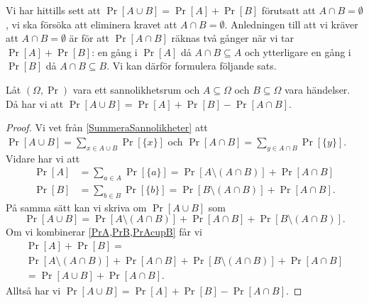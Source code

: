 Vi har hittills sett att \(\Pr[A\cup B] = \Pr[A] + \Pr[B]\) förutsatt att 
\(A\cap B = \emptyset\), vi ska försöka att eliminera kravet att \(A\cap
  B =\emptyset\).
Anledningen till att vi kräver att \(A\cap B = \emptyset\) är för att 
\(\Pr[A\cap B]\) räknas två gånger när vi tar \(\Pr[A] + \Pr[B]\): en gång 
i \(\Pr[A]\) då \(A\cap B\subseteq A\) och ytterligare en gång i \(\Pr[B]\) då 
\(A\cap B\subseteq B\).
Vi kan därför formulera följande sats.

\begin{theorem}
  Låt \((\Omega, \Pr)\) vara ett sannolikhetsrum och \(A\subseteq \Omega\) och 
  \(B\subseteq \Omega\) vara händelser.
  Då har vi att \(\Pr[A\cup B] = \Pr[A] + \Pr[B] - \Pr[A\cap B]\).
\end{theorem}

\begin{proof}
  Vi vet från \cref{SummeraSannolikheter} att \(\Pr[A\cup B] = \sum_{x\in A\cup
      B} \Pr[\{x\}]\) och \(\Pr[A\cap B] = \sum_{y\in A\cap B} \Pr[\{y\}]\).
  Vidare har vi att
  \begin{align}
    \label{PrA}
    \Pr[A] &= \sum_{a\in A} \Pr[\{a\}]
    = \Pr[A\setminus (A\cap B)] + \Pr[A\cap B] \\
    \label{PrB}
    \Pr[B] &= \sum_{b\in B} \Pr[\{b\}]
    = \Pr[B\setminus (A\cap B)] + \Pr[A\cap B].
  \end{align}
  På samma sätt kan vi skriva om \(\Pr[A\cup B]\) som
  \begin{equation}
    \label{PrAcupB}
    \Pr[A\cup B] = \Pr[A\setminus (A\cap B)]
    + \Pr[A\cap B]
    + \Pr[B\setminus (A\cap B)].
  \end{equation}
  Om vi kombinerar \cref{PrA,PrB,PrAcupB} får vi
  \begin{multline}
    \Pr[A] + \Pr[B] = \\
    \Pr[A\setminus (A\cap B)] + \Pr[A\cap B]
    + \Pr[B\setminus (A\cap B)] + \Pr[A\cap B] \\
    = \Pr[A\cup B] + \Pr[A\cap B].
  \end{multline}
  Alltså har vi \(\Pr[A\cup B] = \Pr[A] + \Pr[B] - \Pr[A\cap B]\).
\end{proof}



